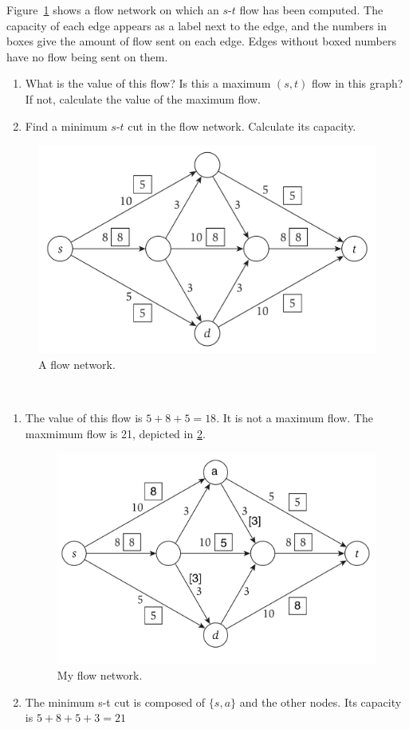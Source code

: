 \begin{exercise}[]{Figure~\ref{fig3} shows a flow network on which an $s$-$t$ flow has been computed. The capacity of each edge appears as a label next to the edge, and the numbers in boxes give the amount of flow sent on each edge. Edges without boxed numbers have no flow being sent on them.

    \begin{enumerate}
        \item What is the value of this flow? Is this a maximum $(s, t)$ flow in this graph? If not, calculate the value of the maximum flow.
        \item Find a minimum $s$-$t$ cut in the flow network. Calculate its capacity.
    \end{enumerate}
    
    \begin{figure}[h]
        \centering
        \includegraphics[width=0.5\linewidth]{img/fig3.png}
        \caption{A flow network.}
        \label{fig3}
    \end{figure}
    }
  \begin{solution}
  \par{~}
  \begin{enumerate}
    \item {
      The value of this flow is $5+8+5=18$. It is not a maximum flow. The maxmimum flow is 21, depicted in \ref{fig4}.
      \begin{figure}[h]
        \centering
        \includegraphics[width=0.5\linewidth]{img/ex5-1.png}
        \caption{My flow network.}
        \label{fig4}
    \end{figure}
    }
    \item {
      The minimum s-t cut is composed of $\{s, a\}$ and the other nodes. Its capacity is $5+8+5+3=21$
    }
  \end{enumerate}
  \end{solution}
  \label{ex1}
\end{exercise}

